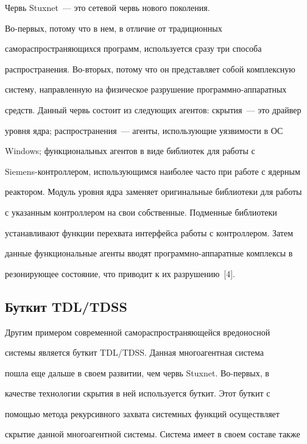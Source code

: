      


     Червь {Stuxnet}~--- это сетевой червь нового поколения. 


     Во-пер\-вых, потому что в нем, в отличие от традиционных 


самораспространяющихся программ, используется сразу три способа 


распространения. Во-вто\-рых, потому что он представляет собой комплексную 


систему, направленную на физическое разрушение прог\-рам\-мно-аппаратных 


средств. Данный червь состоит из следующих агентов: скрытия~--- это драйвер 


уровня ядра; распространения~--- агенты, использующие уязвимости в ОС 


Windows; функциональных агентов в виде библиотек для работы с 


Siemens-контроллером, использующимся наиболее часто при работе с ядерным 


реактором. Модуль уровня ядра заменяет оригинальные библиотеки для работы 


с указанным контроллером на свои собственные. Подменные библиотеки 


устанавливают функции перехвата интерфейса работы с контроллером. Затем 


данные функциональные агенты вводят программно-аппаратные комплексы в 


резонирующее состояние, что приводит к их разрушению~[4]. 





\subsection{Буткит TDL/TDSS}





     Другим примером современной самораспространяющейся вредоносной 


сис\-те\-мы является буткит {TDL/TDSS}. Данная многоагентная система 


пошла еще дальше в своем развитии, чем червь Stuxnet. Во-пер\-вых, в 


качестве технологии скрытия в ней используется буткит. Этот буткит с 


помощью метода рекурсивного захвата системных функций осуществляет 


скрытие данной многоагентной системы. Система имеет в своем составе также 


